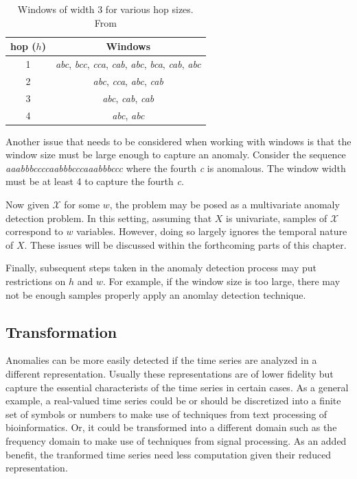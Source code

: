 \begin{table}[h]
  \centering
  \begin{tabular}{|c|c|}
    \hline
    hop ($h$) & Windows \\
    \hline
    \hline
    1 & \emph{abc},
        \emph{bcc}, 
        \emph{cca}, 
        \emph{cab},
        \emph{abc}, 
        \emph{bca},
        \emph{cab},
        \emph{abc} \\
    \hline
    2 & \emph{abc},
        \emph{cca},
        \emph{abc},
        \emph{cab} \\
    \hline
    3 & \emph{abc}, 
        \emph{cab},
        \emph{cab} \\
    \hline
    4 & \emph{abc}, 
        \emph{abc} \\
    \hline
  \end{tabular}
  \caption{Windows of width 3 for various hop sizes. From \cite{Cheboli2010}}
  \label{tbl:hop}
\end{table}

Another issue that needs to be considered when working with windows is that the window size must be large enough to capture an anomaly. Consider the sequence \emph{aaabbbccccaabbbcccaaabbbccc} where the fourth \emph{c} is anomalous. The window width must be at least 4 to capture the fourth \emph{c}. 

Now given $\mathcal{X}$ for some $w$, the problem may be posed as a multivariate anomaly detection problem. In this setting, assuming that $X$ is univariate, samples of $\mathcal{X}$ correspond to $w$ variables. However, doing so largely ignores the temporal nature of $X$. These issues will be discussed within the forthcoming parts of this chapter.

Finally, subsequent steps taken in the anomaly detection process may put restrictions on $h$ and $w$. For example, if the window size is too large, there may not be enough samples properly apply an anomlay detection technique.

\subsection{Transformation}

Anomalies can be more easily detected if the time series are analyzed in a different representation. Usually these representations are of lower fidelity but capture the essential characterists of the time series in certain cases. As a general example, a real-valued time series could be or should be discretized into a finite set of symbols or numbers to make use of techniques from text processing of bioinformatics. Or, it could be transformed into a different domain such as the frequency domain to make use of techniques from signal processing. As an added benefit, the tranformed time series need less computation given their reduced representation.

